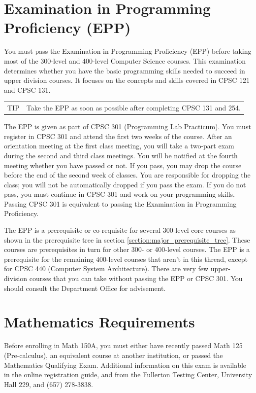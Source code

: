\documentclass{book}
\newenvironment{tip}
               {\tcolorbox \begin{tabular}{m{.5in} m{5in}} \Large{TIP} & }
               {\end{tabular} \endtcolorbox}
\begin{document}
\section{Examination in Programming Proficiency (EPP)}
You must pass the Examination in Programming Proficiency (EPP) before taking most of the 300-level and 400-level Computer Science courses. This examination determines whether you have the basic programming skills needed to succeed in upper division courses. It focuses on the concepts and skills covered in CPSC 121 and CPSC 131.

\begin{tip}
  Take the EPP as soon as possible after completing CPSC 131 and 254.
  \end{tip}

The EPP is given as part of CPSC 301 (Programming Lab Practicum). You must register in CPSC 301 and attend the first two weeks of the course. After an orientation meeting at the first class meeting, you will take a two-part exam during the second and third class meetings. You will be notified at the fourth meeting whether you have passed or not. If you pass, you may drop the course before the end of the second week of classes. You are responsible for dropping the class; you will not be automatically dropped if you pass the exam. If you do not pass, you must continue in CPSC 301 and work on your programming skills. Passing CPSC 301 is equivalent to passing the Examination in Programming Proficiency.

The EPP is a prerequisite or co-requisite for several 300-level core courses as shown in the prerequisite tree in section \ref{section:major_prerequisite_tree}. These courses are prerequisites in turn for other 300- or 400-level courses. The EPP is a prerequisite for the remaining 400-level courses that aren’t in this thread, except for CPSC 440 (Computer System Architecture). There are very few upper-division courses that you can take without passing the EPP or CPSC 301. You should consult the Department Office for advisement.

\section{Mathematics Requirements}

Before enrolling in Math 150A, you must either have recently passed Math 125 (Pre-calculus), an equivalent course at another institution, or passed the Mathematics Qualifying Exam. Additional information on this exam is available in the online registration guide, and from the Fullerton Testing Center, University Hall 229, and (657) 278-3838.
\end{document}
